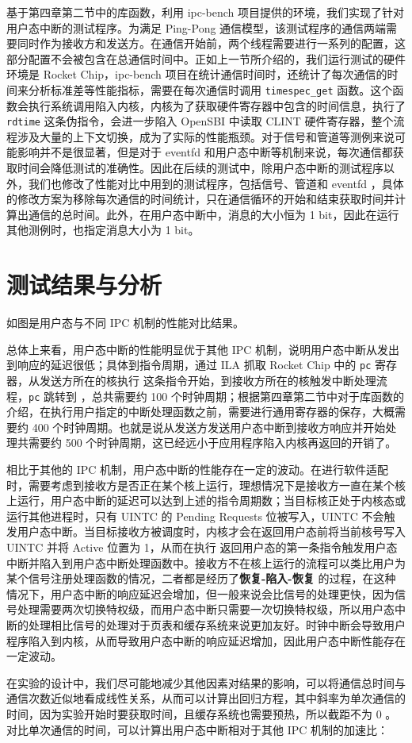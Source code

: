 基于第四章第二节中的库函数，利用 ipc-bench 项目提供的环境，我们实现了针对用户态中断的测试程序。为满足 Ping-Pong 通信模型，该测试程序的通信两端需要同时作为接收方和发送方。在通信开始前，两个线程需要进行一系列的配置，这部分配置不会被包含在总通信时间中。正如上一节所介绍的，我们运行测试的硬件环境是 Rocket Chip，ipc-bench 项目在统计通信时间时，还统计了每次通信的时间来分析标准差等性能指标，需要在每次通信时调用 \texttt{timespec\_get} 函数。这个函数会执行系统调用陷入内核，内核为了获取硬件寄存器中包含的时间信息，执行了 \texttt{rdtime} 这条伪指令，会进一步陷入 OpenSBI 中读取 CLINT 硬件寄存器，整个流程涉及大量的上下文切换，成为了实际的性能瓶颈。对于信号和管道等测例来说可能影响并不是很显著，但是对于 eventfd 和用户态中断等机制来说，每次通信都获取时间会降低测试的准确性。因此在后续的测试中，除用户态中断的测试程序以外，我们也修改了性能对比中用到的测试程序，包括信号、管道和 eventfd ，具体的修改方案为移除每次通信的时间统计，只在通信循环的开始和结束获取时间并计算出通信的总时间。此外，在用户态中断中，消息的大小恒为 1 bit，因此在运行其他测例时，也指定消息大小为 1 bit。

\section{测试结果与分析}

如图是用户态与不同 IPC 机制的性能对比结果。

总体上来看，用户态中断的性能明显优于其他 IPC 机制，说明用户态中断从发出到响应的延迟很低；具体到指令周期，通过 ILA 抓取 Rocket Chip 中的 \texttt{pc} 寄存器，从发送方所在的核执行 \Iuipisend 这条指令开始，到接收方所在的核触发中断处理流程，\texttt{pc} 跳转到 \Rutvec ，总共需要约 100 个时钟周期；根据第四章第二节中对于库函数的介绍，在执行用户指定的中断处理函数之前，需要进行通用寄存器的保存，大概需要约 400 个时钟周期。也就是说从发送方发送用户态中断到接收方响应并开始处理共需要约 500 个时钟周期，这已经远小于应用程序陷入内核再返回的开销了。

相比于其他的 IPC 机制，用户态中断的性能存在一定的波动。在进行软件适配时，需要考虑到接收方是否正在某个核上运行，理想情况下是接收方一直在某个核上运行，用户态中断的延迟可以达到上述的指令周期数；当目标核正处于内核态或运行其他进程时，只有 UINTC 的 Pending Requests 位被写入，UINTC 不会触发用户态中断。当目标接收方被调度时，内核才会在返回用户态前将当前核号写入 UINTC 并将 Active 位置为 1，从而在执行 \Isret 返回用户态的第一条指令触发用户态中断并陷入到用户态中断处理函数中。接收方不在核上运行的流程可以类比用户为某个信号注册处理函数的情况，二者都是经历了\textbf{恢复-陷入-恢复} 的过程，在这种情况下，用户态中断的响应延迟会增加，但一般来说会比信号的处理更快，因为信号处理需要两次切换特权级，而用户态中断只需要一次切换特权级，所以用户态中断的处理相比信号的处理对于页表和缓存系统来说更加友好。时钟中断会导致用户程序陷入到内核，从而导致用户态中断的响应延迟增加，因此用户态中断性能存在一定波动。

在实验的设计中，我们尽可能地减少其他因素对结果的影响，可以将通信总时间与通信次数近似地看成线性关系，从而可以计算出回归方程，其中斜率为单次通信的时间，因为实验开始时要获取时间，且缓存系统也需要预热，所以截距不为 0 。对比单次通信的时间，可以计算出用户态中断相对于其他 IPC 机制的加速比：

